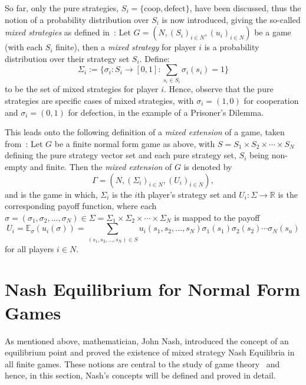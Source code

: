 So far, only the pure strategies, \(S_{i}=\{\text{coop}, \text{defect}\} \), have
been discussed, thus the notion of a probability distribution over \(S_{i}\) is
now introduced, giving the so-called \textit{mixed strategies} as defined in~\cite{maschler_solan_zamir_2013}:
Let \(G=(N, (S_{i})_{i \in N}, (u_{i})_{i \in N})\) be a game (with each 
\(S_{i}\) finite), then a \textit{mixed strategy} for player \(i\) is a
probability distribution over their strategy set \(S_{i}\). Define:
\[
\Sigma_{i} := \{\sigma_{i} : S_{i} \to [0, 1] : \sum_{s_{i} \in S_{i}}{\sigma_
{i}(s_{i})} = 1\}   
\]
to be the set of mixed strategies for player \(i\). Hence, observe that the pure
strategies are specific cases of mixed strategies, with \(\sigma_{i} = (1, 0)\)
for cooperation and \(\sigma_{i} = (0, 1)\) for defection, in the example of a
Prisoner's Dilemma.

This leads onto the following definition of a \emph{mixed extension} of a game,
taken from~\cite{maschler_solan_zamir_2013}:
Let \(G\) be a finite normal form game as above, with \(S = S_{1} \times
S_{2} \times \cdots \times S_{N}\) defining the pure strategy vector set and
each pure strategy set, \(S_{i}\) being non-empty and finite. Then the
\textit{mixed extension} of \(G\) is denoted by
\[
    \Gamma = (N, (\Sigma_{i})_{i \in N}, (U_{i})_{i \in N}),
\]
and is the game in which, \(\Sigma_{i}\) is the \(i\)th player's strategy set
and \(U_{i} : \Sigma \to \mathbb{R}\) is the corresponding payoff function,
where each \(\sigma = (\sigma_{1}, \sigma_{2}, \ldots, \sigma_{N}) \in \Sigma =
\Sigma_{1} \times \Sigma_{2} \times \cdots \times \Sigma_{N}\) is mapped to the
payoff
\begin{equation}
    U_{i} = \mathbb{E}_{\sigma}(u_{i}(\sigma)) = \sum_{(s_{1}, s_{2}, \ldots, s_
    {N}) \in S}{u_{i}(s_{1}, s_{2}, \ldots, s_{N})\sigma_{1}(s_{1})\sigma_{2}(s_
    {2})\cdots\sigma_{N}(s_{n})} 
\end{equation}\label{eqn:mixed_payoff_function}
for all players \(i \in N\).

\section{Nash Equilibrium for Normal Form Games}\label{sec:NE_for_Normal_Form_Games}
As mentioned above, mathematician, John Nash, introduced the concept of an
equilibrium point and proved the existence of mixed strategy Nash Equilibria in
all finite games. These notions are central to the study of game
theory~\cite{maschler_solan_zamir_2013} and hence, in this section, Nash's
concepts will be defined and proved in detail.

